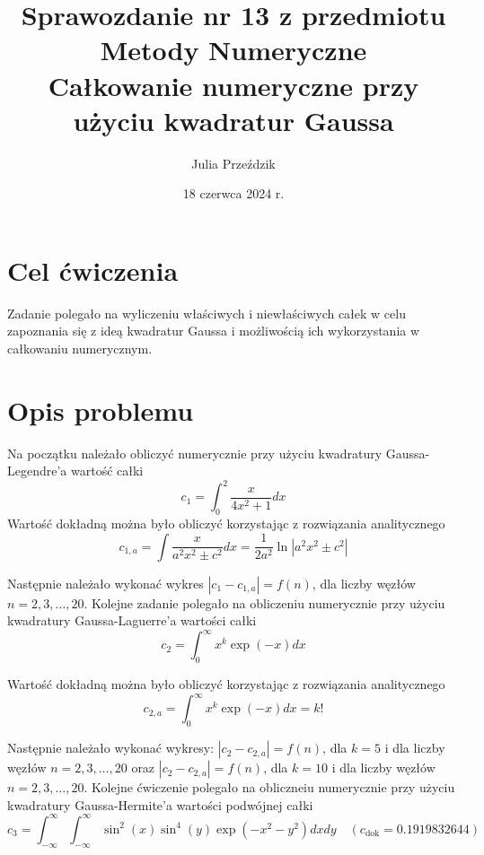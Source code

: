 \documentclass{article}
\begin{document}
\Large

\title{\LARGE Sprawozdanie nr 13 z przedmiotu Metody Numeryczne\\
       \LARGE Całkowanie numeryczne przy użyciu kwadratur Gaussa}
\author{Julia Przeździk}
\date{18 czerwca 2024 r.}
\maketitle

\large

\section{Cel ćwiczenia}
Zadanie polegało na wyliczeniu właściwych i niewłaściwych całek w celu zapoznania się z ideą  kwadratur Gaussa i możliwością ich wykorzystania w całkowaniu numerycznym.

\section{Opis problemu}

Na początku należało obliczyć numerycznie przy użyciu kwadratury Gaussa-Legendre'a wartość całki
\begin{equation*}
c_1 = \int_{0}^{2} \frac{x}{4x^2 + 1} dx
\end{equation*}
\noindent
Wartość dokładną można było obliczyć korzystając z rozwiązania analitycznego
\begin{equation*}
c_{1,a} = \int \frac{x}{a^2 x^2 \pm c^2} dx = \frac{1}{2a^2} \ln|a^2 x^2 \pm c^2|
\end{equation*}

\noindent
Następnie należało wykonać wykres $|c_1 - c_{1,a}| = f(n)$, dla liczby węzłów $n = 2, 3, \ldots, 20$.
\noindent
Kolejne zadanie polegało na obliczeniu numerycznie przy użyciu kwadratury Gaussa-Laguerre'a wartości całki
\begin{equation*}
c_2 = \int_{0}^{\infty} x^k \exp(-x) dx
\end{equation*}

\noindent
Wartość dokładną można było obliczyć korzystając z rozwiązania analitycznego
\begin{equation*}
c_{2,a} = \int_{0}^{\infty} x^k \exp(-x) dx = k!
\end{equation*}

\noindent
Następnie należało wykonać wykresy: $|c_2 - c_{2,a}| = f(n)$, dla $k = 5$ i dla liczby węzłów $n = 2, 3, \ldots, 20$ oraz  $|c_2 - c_{2,a}| = f(n)$, dla $k = 10$ i dla liczby węzłów $n = 2, 3, \ldots, 20$.
\noindent
Kolejne ćwiczenie polegało na obliczneiu numerycznie przy użyciu kwadratury Gaussa-Hermite'a wartości podwójnej całki
\begin{equation*}
c_3 = \int_{-\infty}^{\infty} \int_{-\infty}^{\infty} \sin^2(x) \sin^4(y) \exp(-x^2 - y^2) dx dy \quad (c_{\text{dok}} = 0.1919832644)
\end{equation*}
\end{document}
